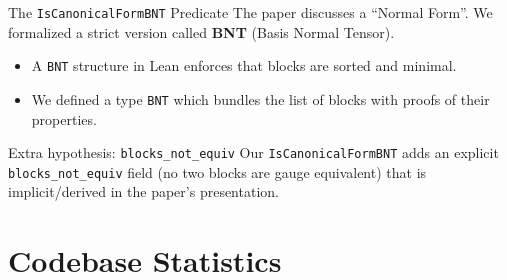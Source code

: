 \documentclass[aspectratio=169,10pt]{beamer}
\begin{document}
\begin{frame}{The \texttt{IsCanonicalFormBNT} Predicate}
    The paper \cite{Cirac2021Matrix} discusses a ``Normal Form''.
    We formalized a strict version called \textbf{BNT} (Basis Normal Tensor).
    
    \begin{itemize}
        \item A \texttt{BNT} structure in Lean enforces that blocks are sorted and minimal.
        \item We defined a type \texttt{BNT} which bundles the list of blocks with proofs of their properties.
    \end{itemize}

    \begin{alertblock}{Extra hypothesis: \texttt{blocks\_not\_equiv}}
        Our \texttt{IsCanonicalFormBNT} adds an explicit
        \texttt{blocks\_not\_equiv} field (no two blocks are gauge equivalent)
        that is implicit/derived in the paper's presentation.
    \end{alertblock}
\end{frame}

\section{Codebase Statistics}
\end{document}
